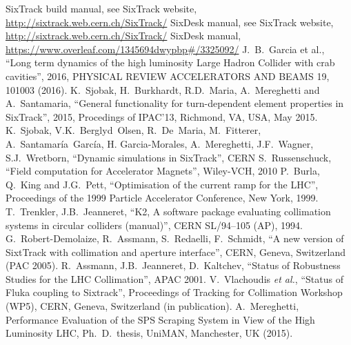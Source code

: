 \begin{thebibliography}{99}
        SixTrack build manual, see SixTrack website, \url{http://sixtrack.web.cern.ch/SixTrack/}
        SixDesk manual, see SixTrack website, \url{http://sixtrack.web.cern.ch/SixTrack/}
        SixDesk manual, \url{https://www.overleaf.com/1345694dwypbp#/3325092/}
        J.~B.~Garcia et al.,
        ``Long term dynamics of the high luminosity Large Hadron Collider with crab cavities'',
        2016, PHYSICAL REVIEW ACCELERATORS AND BEAMS 19, 101003 (2016).
        K.~Sjobak, H.~Burkhardt, R.D.~Maria, A.~Mereghetti and A.~Santamaria,
        ``General functionality for turn-dependent element properties in SixTrack'',
        2015, Procedings of IPAC'13, Richmond, VA, USA, May 2015.
        K.~Sjobak, V.K.~Berglyd~Olsen, R.~De~Maria, M.~Fitterer, A.~Santamaría~García, H. Garcia-Morales, A.~Mereghetti, J.F.~Wagner, S.J.~Wretborn,
        ``Dynamic simulations in SixTrack'',
        CERN
        S.~Russenschuck,
        ``Field computation for Accelerator Magnets'',
        Wiley-VCH, 2010
        P.~Burla, Q.~King and J.G.~Pett,
        ``Optimisation of the current ramp for the LHC'',
        Proceedings of the 1999 Particle Accelerator Conference, New York, 1999.
        T.~Trenkler, J.B.~Jeanneret,
        ``K2, A software package evaluating collimation systems in circular colliders (manual)'',
        CERN SL/94–105 (AP), 1994.
        G.~Robert-Demolaize, R.~Assmann, S.~Redaelli, F.~Schmidt,
        ``A new version of SixtTrack with collimation and aperture interface'',
        CERN, Geneva, Switzerland (PAC 2005).
        R.~Assmann, J.B.~Jeanneret, D.~Kaltchev,
        ``Status of Robustness Studies for the LHC Collimation'',
        APAC 2001.
        V.~Vlachoudis {\it et al.}, ``Status of Fluka coupling to Sixtrack'',
        Proceedings of Tracking for Collimation Workshop (WP5), CERN, Geneva,
        Switzerland (in publication).
        A.~Mereghetti, Performance Evaluation of the SPS Scraping System
        in View of the High Luminosity LHC, Ph.~D.~thesis, UniMAN, Manchester,
        UK (2015).
\end{thebibliography}
